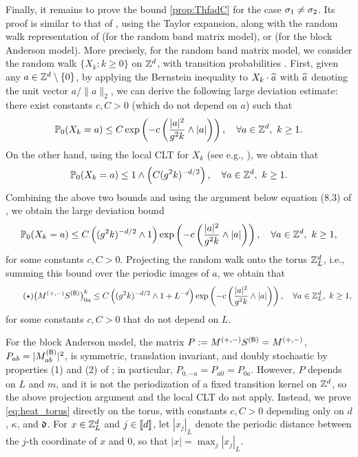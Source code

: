 Finally, it remains to prove the bound \eqref{prop:ThfadC} for the case $\sigma_1\ne \sigma_2$. Its proof is similar to that of \cite[Lemma 2.14]{DYYY25}, using the Taylor expansion, along with the random walk representation of  (for the random band matrix model), or  (for the block Anderson model). 
More precisely, for the random band matrix model, we consider the random walk $\{X_k:k\ge 0\}$ on $\mathbb{Z}^d$, with transition probabilities .  
First, given any $a\in \mathbb{Z}^d\setminus\{0\}$, by applying the Bernstein inequality to $X_k\cdot \widehat a$ with $\widehat a$ denoting the unit vector $a/\|a\|_2$, we can derive the following large deviation estimate: there exist constants $c, C>0$ (which do not depend on $a$) such that 
\[ \mathbb{P}_0(X_k=a) \le C\exp\left({-c \left({\frac{|a|^2}{g^2k}\wedge |a|}\right)}\right),\quad \forall a\in \mathbb{Z}^d,\ k\ge 1 . \]
On the other hand, using the local CLT for $X_k$ (see e.g., \cite[Section 2]{Lawler_book}), we obtain that 
\[ \mathbb{P}_0(X_k=a) \le 1\wedge \left({C (g^2k)^{-d/2}}\right),\quad \forall a\in \mathbb{Z}^d,\ k\ge 1 . \]
Combining the above two bounds and using the argument below equation (8.3) of \cite{DYYY25}, we obtain the large deviation bound
\[ \mathbb{P}_0(X_k=a) \le C\left({ (g^2k)^{-d/2}\wedge 1}\right)\exp\left({-c \left({\frac{|a|^2}{g^2k}\wedge |a|}\right)}\right),\quad \forall a\in \mathbb{Z}^d,\ k\ge 1,  \]
for some constants $c,C>0$. Projecting the random walk onto the torus ${\mathbb Z}_L^d$, i.e., summing this bound over the periodic images of $a$, we obtain that
\begin{equation*}\label{eq:heat_torus}\tag{$\star$}
\big(M^{(+,-)}S^{({\mathsf{B}})}\big)_{0a}^k \le C\left({ (g^2k)^{-d/2}\wedge 1+L^{-d}}\right)\exp\left({-c \left({\frac{|a|^2}{g^2k}\wedge |a|}\right)}\right),\quad \forall a\in {\mathbb Z}_L^d,\ k\ge 1,
\end{equation*}
for some constants $c,C>0$ that do not depend on $L$. 

For the block Anderson model, the matrix $P:=M^{(+,-)}S^{({\mathsf{B}})}=M^{(+,-)}$, $P_{ab}=|M^{({\mathsf{B}})}_{ab}|^2$, is symmetric, translation invariant, and doubly stochastic by properties (1) and (2) of ; in particular, $P_{0,-a}=P_{a0}=P_{0a}$. However, $P$ depends on $L$ and $m$, and it is not the periodization of a fixed transition kernel on $\mathbb{Z}^d$, so the above projection argument and the local CLT do not apply. Instead, we prove \eqref{eq:heat_torus} directly on the torus, with constants $c,C>0$ depending only on $d$, $\kappa$, and ${\mathfrak d}$. For $x\in {\mathbb Z}_L^d$ and $j\in\llbracket{d}\rrbracket$, let $|x_j|_L$ denote the periodic distance between the $j$-th coordinate of $x$ and $0$, so that $|x|=\max_j|x_j|_L$. 

